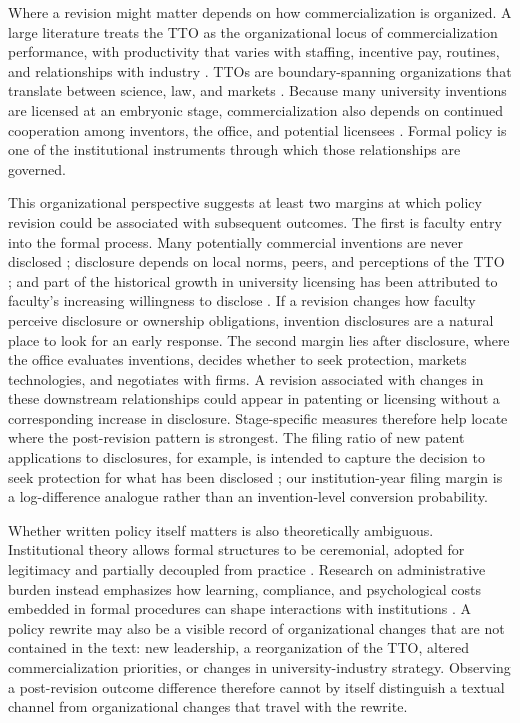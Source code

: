 Where a revision might matter depends on how commercialization is organized. A large literature treats the TTO as the organizational locus of commercialization performance, with productivity that varies with staffing, incentive pay, routines, and relationships with industry \citep{SiegelWaldmanLink2003,SiegelWaldmanAtwater2004,ThursbyKemp2002,MarkmanEtAl2005,OsheaEtAl2005}. TTOs are boundary-spanning organizations that translate between science, law, and markets \citep{DebackereVeugelers2005,PerkmannEtAl2013,HolgerssonEtAl2019}. Because many university inventions are licensed at an embryonic stage, commercialization also depends on continued cooperation among inventors, the office, and potential licensees \citep{JensenThursby2001}. Formal policy is one of the institutional instruments through which those relationships are governed.

This organizational perspective suggests at least two margins at which policy revision could be associated with subsequent outcomes. The first is faculty entry into the formal process. Many potentially commercial inventions are never disclosed \citep{JensenThursbyThursby2003}; disclosure depends on local norms, peers, and perceptions of the TTO \citep{OwenSmithPowell2001,BercovitzFeldman2008}; and part of the historical growth in university licensing has been attributed to faculty's increasing willingness to disclose \citep{ThursbyThursby2002}. If a revision changes how faculty perceive disclosure or ownership obligations, invention disclosures are a natural place to look for an early response. The second margin lies after disclosure, where the office evaluates inventions, decides whether to seek protection, markets technologies, and negotiates with firms. A revision associated with changes in these downstream relationships could appear in patenting or licensing without a corresponding increase in disclosure. Stage-specific measures therefore help locate where the post-revision pattern is strongest. The filing ratio of new patent applications to disclosures, for example, is intended to capture the decision to seek protection for what has been disclosed \citep{ChoudhryPonzio2020,Hall2021}; our institution-year filing margin is a log-difference analogue rather than an invention-level conversion probability.

Whether written policy itself matters is also theoretically ambiguous. Institutional theory allows formal structures to be ceremonial, adopted for legitimacy and partially decoupled from practice \citep{MeyerRowan1977}. Research on administrative burden instead emphasizes how learning, compliance, and psychological costs embedded in formal procedures can shape interactions with institutions \citep{MoynihanHerdHarvey2015,HerdMoynihan2018}. A policy rewrite may also be a visible record of organizational changes that are not contained in the text: new leadership, a reorganization of the TTO, altered commercialization priorities, or changes in university-industry strategy. Observing a post-revision outcome difference therefore cannot by itself distinguish a textual channel from organizational changes that travel with the rewrite.

